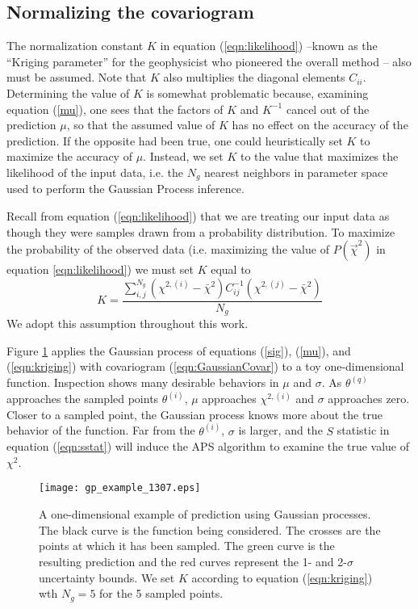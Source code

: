 \documentclass[useAMS,usenatbib]{aastex}
\newcommand{\APS}{APS }
\begin{document}
\subsection{Normalizing the covariogram}
\label{sec:kriging}

The normalization constant $K$ in equation (\ref{eqn:likelihood}) --known as the
``Kriging parameter'' for the geophysicist who pioneered the overall method -- 
also
must be assumed.  Note that $K$ also multiplies the diagonal elements
$C_{ii}$.  Determining the value of $K$ 
is somewhat problematic because, examining equation
(\ref{mu}), one sees that the factors of $K$ and $K^{-1}$
cancel out of
the prediction $\mu$, so that the assumed value of $K$ has no effect on the accuracy
of the prediction.  
If the opposite had been true, one could heuristically set $K$ to
maximize the accuracy of $\mu$.  
Instead, we set $K$ to the value that maximizes the likelihood
of the input data, i.e. the $N_g$ nearest neighbors in parameter space
used to perform the Gaussian Process inference.

Recall from equation (\ref{eqn:likelihood}) that we are treating our
input data as though they were samples drawn from a probability distribution.
To maximize the probability of the observed data (i.e. maximizing the value
of $P(\vec{\chi}^2)$ in equation \ref{eqn:likelihood}) we must set $K$ equal to
\begin{equation}
\label{eqn:kriging}
K=\frac{\sum_{i,j}^{N_g}(\chi^{2,(i)}-\bar{\chi}^2)
C^{-1}_{ij}(\chi^{2,(j)}-\bar{\chi}^2)}
{N_g}
\end{equation}
We adopt this assumption throughout this work.

Figure \ref{fig:gp} applies the Gaussian process of equations (\ref{sig}), 
(\ref{mu}), and (\ref{eqn:kriging}) with covariogram (\ref{eqn:GaussianCovar})
to a toy one-dimensional function.  Inspection shows many desirable
behaviors in $\mu$ and $\sigma$.  
As $\theta^{(q)}$ approaches the sampled points $\theta^{(i)}$, $\mu$
approaches $\chi^{2,(i)}$ and $\sigma$ approaches zero.  
Closer to a sampled point,
the Gaussian process knows more about the true behavior of the function. 
Far from the $\theta^{(i)}$, $\sigma$ is larger, and the $S$ statistic in
equation (\ref{eqn:sstat}) will induce the \APS
algorithm to examine the true value of $\chi^2$.

\begin{figure}
\texttt{[image: gp\_example\_1307.eps]}
\caption{
A one-dimensional example of prediction using Gaussian processes.  
The black curve is the function
being considered.  The crosses are the points at which it has been sampled.  The
green curve is the resulting prediction and the red curves represent the 
1- and
2-$\sigma$ uncertainty bounds.  We set $K$ according to 
equation (\ref{eqn:kriging}) wth $N_g=5$ for the 5 sampled points.
}
\label{fig:gp}
\end{figure}
\end{document}
